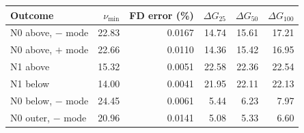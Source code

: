\begin{tabular}{lrrrrr}\toprule
Outcome & $\nu_{\min}$ & FD error (\%) & $\Delta G_{25}$ & $\Delta G_{50}$ & $\Delta G_{100}$\\\midrule
N0 above, $-$ mode & 22.83 & 0.0167 & 14.74 & 15.61 & 17.21\\
N0 above, $+$ mode & 22.66 & 0.0110 & 14.36 & 15.42 & 16.95\\
N1 above & 15.32 & 0.0051 & 22.58 & 22.36 & 22.54\\
N1 below & 14.00 & 0.0041 & 21.95 & 22.11 & 22.13\\
N0 below, $-$ mode & 24.45 & 0.0061 & 5.44 & 6.23 & 7.97\\
N0 outer, $-$ mode & 20.96 & 0.0141 & 5.08 & 5.33 & 6.60\\
\bottomrule\end{tabular}

